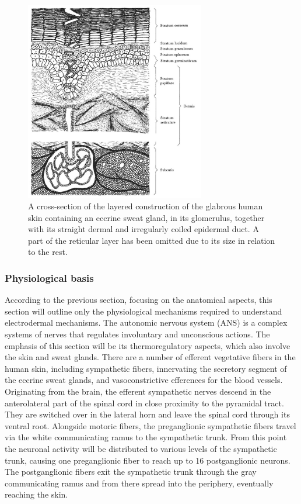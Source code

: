 \begin{figure}[ht]
\centering
\includegraphics[width=0.7\textwidth]{images/skinGlabrous.png}
\caption{A cross-section of the layered construction of the glabrous human skin containing an eccrine sweat gland, in its glomerulus, together with its straight dermal and irregularly coiled epidermal duct. A part of the reticular layer has been omitted due to its size in relation to the rest. \citep{boucsein2013electrodermal}}
\label{layerImg}
\end{figure}

\subsubsection{Physiological basis}
According to the previous section, focusing on the anatomical aspects, this section will outline only the physiological mechanisms required to understand electrodermal mechanisms. 
The autonomic nervous system (ANS) is a complex systems of nerves that regulates involuntary and unconscious actions. The emphasis of this section will be its thermoregulatory aspects, which also involve the skin and sweat glands. 
There are a number of efferent vegetative fibers in the human skin, including sympathetic fibers, innervating the secretory segment of the eccrine sweat glands, and vasoconstrictive efferences for the blood vessels. Originating from the brain, the efferent sympathetic nerves descend in the anterolateral part of the spinal cord in close proximity to the pyramidal tract. They are switched over in the lateral horn and leave the spinal cord through its ventral root. Alongside motoric fibers, the preganglionic sympathetic fibers travel via the white communicating ramus to the sympathetic trunk. From this point the neuronal activity will be distributed to various levels of the sympathetic trunk, causing one preganglionic fiber to reach up to 16 postganglionic neurons. The postganglionic fibers exit the sympathetic trunk through the gray communicating ramus and from there spread into the periphery, eventually reaching the skin.


